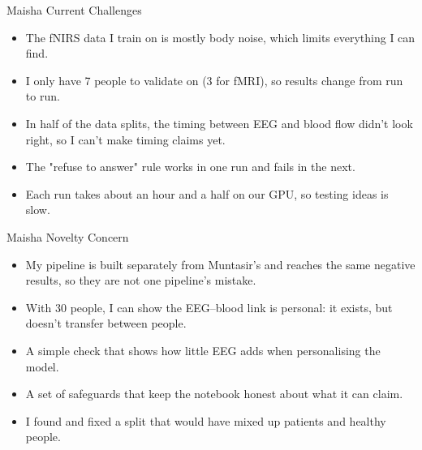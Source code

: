 \documentclass[aspectratio=169,11pt]{beamer}
\begin{document}
\begin{frame}{Maisha Current Challenges}
\begin{slidebox}
\begin{itemize}\setlength{\itemsep}{5pt}
  \item The fNIRS data I train on is mostly body noise, which limits everything I can find.
  \item I only have 7 people to validate on (3 for fMRI), so results change from run to run.
  \item In half of the data splits, the timing between EEG and blood flow didn't look right, so I can't make timing claims yet.
  \item The "refuse to answer" rule works in one run and fails in the next.
  \item Each run takes about an hour and a half on our GPU, so testing ideas is slow.
\end{itemize}
\end{slidebox}
\end{frame}

\begin{frame}{Maisha Novelty Concern}
\begin{slidebox}
\begin{itemize}\setlength{\itemsep}{5pt}
  \item My pipeline is built separately from Muntasir's and reaches the same negative results, so they are not one pipeline's mistake.
  \item With 30 people, I can show the EEG--blood link is personal: it exists, but doesn't transfer between people.
  \item A simple check that shows how little EEG adds when personalising the model.
  \item A set of safeguards that keep the notebook honest about what it can claim.
  \item I found and fixed a split that would have mixed up patients and healthy people.
\end{itemize}
\end{slidebox}
\end{frame}
\end{document}
